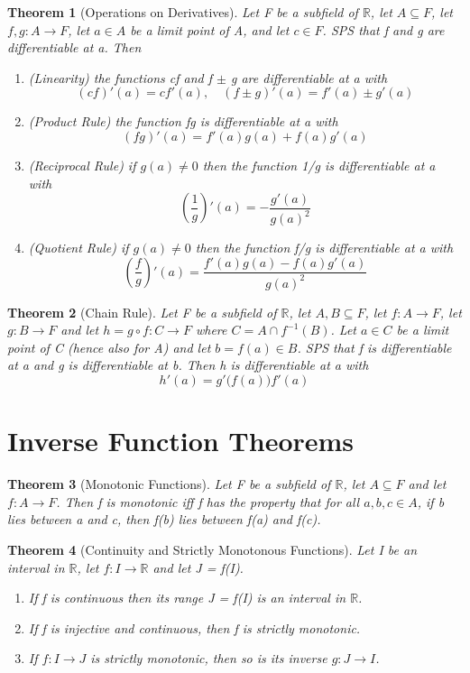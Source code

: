 \documentclass[11pt, oneside]{book}
\theoremstyle{break}
\newtheorem{thm}{Theorem}[section]
\newcommand{\bb}[1]{\mathbb{#1}}			%
\begin{document}
\begin{thm}[Operations on Derivatives]
	Let F be a subfield of $\bb{R}$, let $A \subseteq F$, let $f, g: A \to F$, let $a \in A$ be a limit point of A, and let $c \in F$. SPS that f and g are differentiable at a. Then
	\begin{enumerate}
		\item (Linearity) the functions cf and f $\pm$ g are differentiable at a with
			\[
				(cf)'(a) = cf'(a), \quad (f \pm g)'(a) = f'(a) \pm g'(a)
			\]
		\item (Product Rule) the function fg is differentiable at a with
			\[
				(fg)'(a) = f'(a)g(a) + f(a)g'(a)
			\]
		\item (Reciprocal Rule) if $g(a) \neq 0$ then the function 1/g is differentiable at a with
			\[
				(\frac{1}{g})'(a) = -\frac{g'(a)}{g(a)^2}
			\]
		\item (Quotient Rule) if $g(a) \neq 0$ then the function f/g is differentiable at a with
			\[
				(\frac{f}{g})'(a) = \frac{f'(a)g(a) - f(a)g'(a)}{g(a)^2}
			\]
	\end{enumerate}
\end{thm}

\begin{thm}[Chain Rule]
	Let F be a subfield of $\bb{R}$, let $A, B \subseteq F$, let $f: A \to F$, let $g:B \to F$ and let $h = g \circ f: C \to F$ where $C = A \cap f^{-1}(B)$. Let $a \in C$ be a limit point of C (hence also for A) and let $b = f(a) \in B$. SPS that f is differentiable at a and g is differentiable at b. Then h is differentiable at a with
	\[
		h'(a) = g'\big( f(a) \big)f'(a)
	\]
\end{thm}


\section{Inverse Function Theorems}

\begin{thm}[Monotonic Functions]
	Let F be a subfield of $\bb{R}$, let $A \subseteq F$ and let $f: A \to F$. Then f is monotonic iff f has the property that for all $a, b, c \in A$, if b lies between a and c, then f(b) lies between f(a) and f(c).
\end{thm}

\begin{thm}[Continuity and Strictly Monotonous Functions]
	Let I be an interval in $\bb{R}$, let $f: I \to \bb{R}$ and let J = f(I).
	\begin{enumerate}
		\item If f is continuous then its range J = f(I) is an interval in $\bb{R}$.
		\item If f is injective and continuous, then f is strictly monotonic.
		\item If $f: I \to J$ is strictly monotonic, then so is its inverse $g: J \to I$.
	\end{enumerate}
\end{thm}
\end{document}
